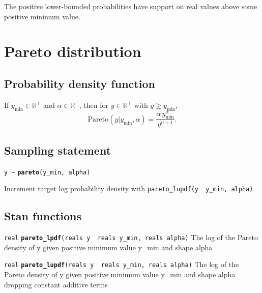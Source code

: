 \documentclass[
  10pt,
]{book}
\begin{document}
The positive lower-bounded probabilities have support on real values
above some positive minimum value.

\hypertarget{pareto-distribution}{%
\section{Pareto distribution}\label{pareto-distribution}}

\hypertarget{probability-density-function-18}{%
\subsection{Probability density function}\label{probability-density-function-18}}

If \(y_{\text{min}} \in \mathbb{R}^+\) and \(\alpha \in \mathbb{R}^+\),
then for \(y \in \mathbb{R}^+\) with \(y \geq y_{\text{min}}\), \[
\text{Pareto}(y|y_{\text{min}},\alpha) = \frac{\displaystyle
\alpha\,y_{\text{min}}^\alpha}{\displaystyle y^{\alpha+1}}. \]

\hypertarget{sampling-statement-42}{%
\subsection{Sampling statement}\label{sampling-statement-42}}

\texttt{y\ \textasciitilde{}} \textbf{\texttt{pareto}}\texttt{(y\_min,\ alpha)}

Increment target log probability density with \texttt{pareto\_lupdf(y\ \textbar{}\ y\_min,\ alpha)}.

\hypertarget{stan-functions-41}{%
\subsection{Stan functions}\label{stan-functions-41}}


\texttt{real} \textbf{\texttt{pareto\_lpdf}}\texttt{(reals\ y\ \textbar{}\ reals\ y\_min,\ reals\ alpha)}\newline
The log of the Pareto density of y given positive minimum value y\_min
and shape alpha


\texttt{real} \textbf{\texttt{pareto\_lupdf}}\texttt{(reals\ y\ \textbar{}\ reals\ y\_min,\ reals\ alpha)}\newline
The log of the Pareto density of y given positive minimum value y\_min
and shape alpha dropping constant additive terms
\end{document}
